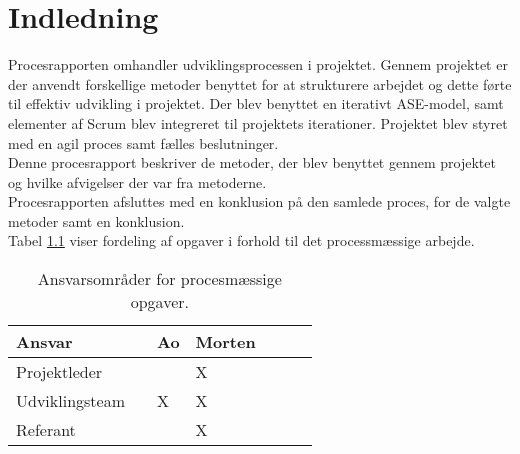 \chapter{Indledning}
Procesrapporten omhandler udviklingsprocessen i projektet. Gennem projektet er der anvendt
forskellige metoder benyttet for at strukturere arbejdet og dette førte til effektiv
udvikling i projektet.
Der blev benyttet en iterativt ASE-model, samt elementer af Scrum blev integreret til projektets iterationer.
Projektet blev styret med en agil proces samt fælles beslutninger. \\
Denne procesrapport beskriver de metoder, der blev benyttet gennem
projektet og hvilke afvigelser der var fra metoderne. \\ 
Procesrapporten afsluttes med en konklusion på den samlede proces, for de valgte metoder samt en konklusion. \\
Tabel \ref{ProcessTabel} viser fordeling af opgaver i forhold til det processmæssige arbejde.

\begin{table}[H]
	\centering
	\begin{tabular}{lllllll} \hline
		\textbf{Ansvar} &  & \textbf{Ao}&  \textbf{Morten}&   \\ \hline
		Projektleder&  &  &  X&  \\ \hline
		Udviklingsteam& & X& X& \\  \hline
		Referant& & & X& \\ \hline
	\end{tabular}
	\caption{Ansvarsområder for procesmæssige opgaver.}
	\label{ProcessTabel}
\end{table}